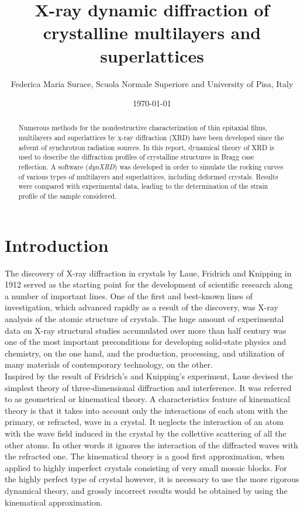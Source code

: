 \documentclass[12pt,oneside,notitlepage,abstracton,a4paper]{scrartcl}
\title{\Large X-ray dynamic diffraction of crystalline multilayers and superlattices}
\author{\normalsize Federica Maria Surace, Scuola Normale Superiore and University of Pisa, Italy}
\date{\normalsize \today}
\begin{document}
\maketitle

\begin{abstract}

\noindent

Numerous methods for the nondestructive characterization of thin epitaxial films,
multilayers and superlattices by x-ray diffraction (XRD) have been developed since the advent of synchrotron radiation sources. In this report, dynamical theory of XRD is used to describe the diffraction profiles of crystalline structures in Bragg case reflection. A software (\textit{dynXRD}) was developed in order to simulate the rocking curves of various types of multilayers and superlattices, including deformed crystals. Results were compared with experimental data, leading to the determination of the strain profile of the sample considered.
\end{abstract}



\newpage


\tableofcontents
\newpage 

\section{Introduction}
\label{intro}
The discovery of X-ray diffraction in crystals by Laue, Fridrich and Knipping in 1912 served as the starting point for the development of scientific research along a number of important lines. One of the first and best-known lines of investigation, which advanced rapidly as a result of the discovery, was X-ray analysis of the atomic structure of crystals. The huge amount of experimental data on X-ray structural studies accumulated over more than half century was one of the most important preconditions for developing solid-state physics and chemistry, on the one hand, and the production, processing, and utilization of many materials of contemporary technology, on the other.
\\

Inspired by the result of Fridrich's and Knipping's experiment, Laue devised the simplest theory of three-dimensional diffraction and interference. It was referred to as geometrical or kinematical theory. A characteristics feature of kinematical theory is that it takes into account only the interactions of each atom with the primary, or refracted, wave in a crystal. It neglects the interaction of an atom with the wave field induced in the crystal by the collettive scattering of all the other atoms. In other words it ignores the interaction of the diffracted waves with the refracted one. The kinematical theory is a good first approximation, when applied to highly imperfect crystals consisting of very small mosaic blocks. For the highly perfect type of crystal however, it is necessary to use the more rigorous dynamical theory, and grossly incorrect results would be obtained by using the kinematical approximation.
\end{document}
